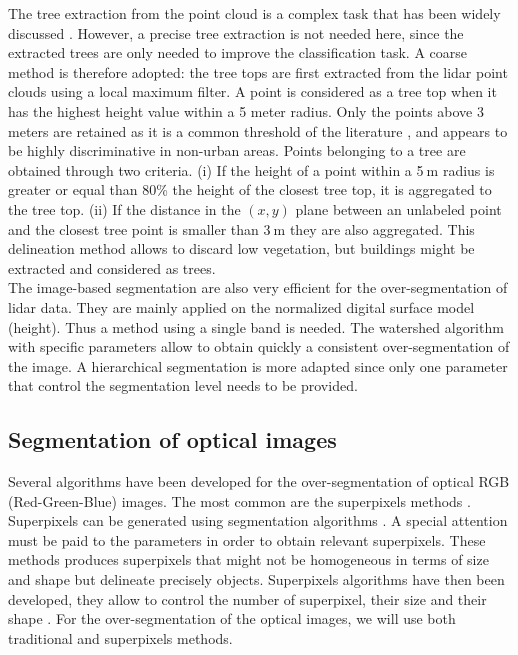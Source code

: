 The tree extraction from the point cloud is a complex task that has been widely discussed \citep{dalponte2014tree, vega2014ptrees, kandare2014new}. However, a precise tree extraction is not needed here, since the extracted trees are only needed to improve the classification task. A coarse method is therefore adopted: the tree tops are first extracted from the lidar point clouds using a local maximum filter. A point is considered as a tree top when it has the highest height value within a 5 meter radius. Only the points above 3$\:$meters are retained as it is a common threshold of the literature \citep{eysn2012forest}, and appears to be highly discriminative in non-urban areas. Points belonging to a tree are obtained through two criteria. (i) If the height of a point within a 5$\:$m radius is greater or equal than 80\% the height of the closest tree top, it is aggregated to the tree top. (ii) If the distance in the  $(x,y)$ plane between an unlabeled point and the closest tree point is smaller than 3$\:$m  they are also aggregated. This delineation method allows to discard low vegetation, but buildings might be extracted and considered as trees. \\

The image-based segmentation are also very efficient for the over-segmentation of lidar data. They are mainly applied on the normalized digital surface model (height). Thus a method using a single band is needed. The watershed algorithm \citep{vincent1991watersheds} with specific parameters allow to obtain quickly a consistent over-segmentation of the image. A hierarchical segmentation \citep{guigues2006scale} is more adapted since only one parameter that control the segmentation level needs to be provided.

\subsection{Segmentation of optical images}
Several algorithms have been developed for the over-segmentation of optical RGB (Red-Green-Blue) images. The most common are the superpixels methods \citep{achanta2012slic}. Superpixels can be generated using segmentation algorithms \citep{shi2000normalized, felzenszwalb2004efficient, comaniciu2002mean, vedaldi2008quick, vincent1991watersheds}. A special attention must be paid to the parameters in order to obtain relevant superpixels. These methods produces superpixels that might not be homogeneous in terms of size and shape but delineate precisely objects.
Superpixels algorithms have then been developed, they allow to control the number of superpixel, their size and their shape \citep{moore2008superpixel, veksler2010superpixels, levinshtein2009turbopixels, achanta2012slic}.
For the over-segmentation of the optical images, we will use both traditional and superpixels methods.

